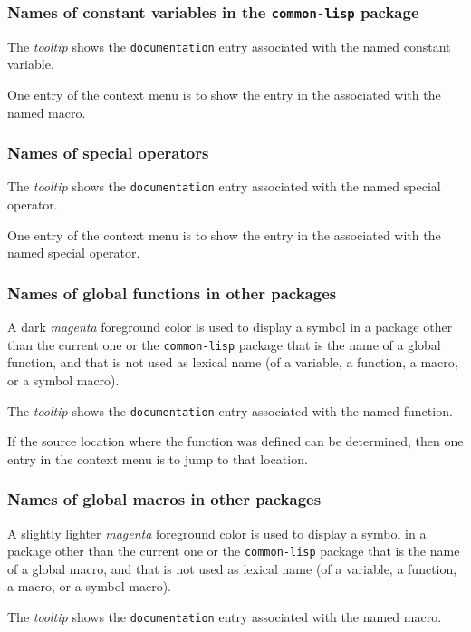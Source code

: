 \subsubsection{Names of constant variables in the \texttt{common-lisp} package}

The \emph{tooltip} shows the \texttt{documentation} entry associated
with the named constant variable.

One entry of the context menu is to show the entry in the \hs{}
associated with the named macro.

\subsubsection{Names of special operators}

The \emph{tooltip} shows the \texttt{documentation} entry associated
with the named special operator.

One entry of the context menu is to show the entry in the \hs{}
associated with the named special operator.

\subsubsection{Names of global functions in other packages}

A dark \emph{magenta} foreground color is used to display a symbol in
a package other than the current one or the \texttt{common-lisp}
package that is the name of a global function, and that is not used as
lexical name (of a variable, a function, a macro, or a symbol macro).

The \emph{tooltip} shows the \texttt{documentation} entry associated
with the named function.

If the source location where the function was defined can be
determined, then one entry in the context menu is to jump to that
location.

\subsubsection{Names of global macros in other packages}

A slightly lighter \emph{magenta} foreground color is used to display
a symbol in a package other than the current one or the
\texttt{common-lisp} package that is the name of a global macro, and
that is not used as lexical name (of a variable, a function, a macro,
or a symbol macro).

The \emph{tooltip} shows the \texttt{documentation} entry associated
with the named macro.

